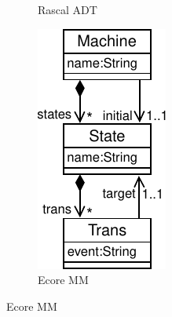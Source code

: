 \begin{figure}[bt]
\begin{subfigure}[t]{.3\columnwidth}
\begin{lstlisting}[label=lst:fsm-adt, language=Rascal, numbers=none, xleftmargin=0pt, tabsize=1, aboveskip=0pt, belowskip=0pt, abovecaptionskip=0pt, showlines=true]
		\end{lstlisting}
		\caption{Rascal ADT}
	\end{subfigure}
	\vrule
	\enskip
	\begin{subfigure}[t]{.26\columnwidth}
		\vskip 5pt
		\includegraphics[width=\textwidth]{figures/fsm-mm}
		\vskip 4pt
		\caption{Ecore MM}
	\end{subfigure}

\end{figure}

